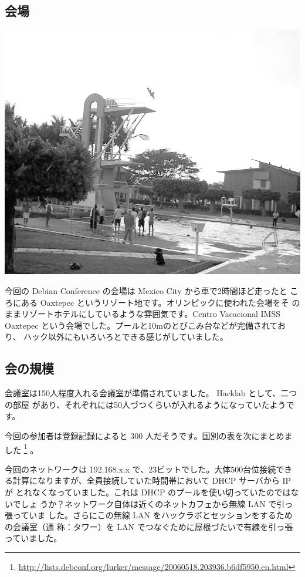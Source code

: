 \documentclass[mingoth,a4paper]{jsarticle}
\begin{document}
\subsection{会場}

\begin{minipage}{0.5\hsize}
\includegraphics[width=0.9\hsize]{image200606/jumping.png}
\end{minipage}
\begin{minipage}{0.5\hsize}
今回の Debian Conference の会場は Mexico City から車で2時間ほど走ったと
ころにある Oaxtepec というリゾート地です。オリンピックに使われた会場をそ
のままリゾートホテルにしているような雰囲気です。Centro Vacacional IMSS
Oaxtepec という会場でした。プールと10mのとびこみ台などが完備されており、
ハック以外にもいろいろとできる感じがしていました。

\end{minipage}

\subsection{会の規模}

会議室は150人程度入れる会議室が準備されていました。 Hacklab として、二つの部屋
があり、それぞれには50人づつくらいが入れるようになっていたようです。

今回の参加者は登録記録によると 300 人だそうです。国別の表を次にまとめま
した
\footnote{\url{http://lists.debconf.org/lurker/message/20060518.203936.b6df5950.en.html}} 
。

今回のネットワークは 192.168.x.x で、23ビットでした。大体500台位接続でき
る計算になりますが、全員接続していた時間帯において DHCP サーバから IP が
とれなくなっていました。これは DHCP のプールを使い切っていたのではないでしょ
うか？ネットワーク自体は近くのネットカフェから無線 LAN で引っ張っていま
した。さらにこの無線 LAN をハックラボとセッションをするための会議室（通
称：タワー）を LAN でつなぐために屋根づたいで有線を引っ張っていました。
\end{document}
